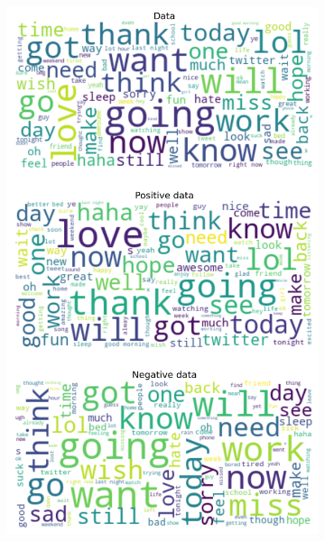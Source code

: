 \documentclass{article}
\begin{document}
\begin{itemize}
\begin{figure}[H]
\begin{subfigure}[b]{0.24\textwidth}
      \includegraphics[width=\textwidth]{chapter-06/section-01-01/03/visualization/2/wordcloud.png}
    \end{subfigure}
    \begin{subfigure}[b]{0.24\textwidth}
      \centering

\end{subfigure}
\end{figure}
\end{itemize}
\end{document}
